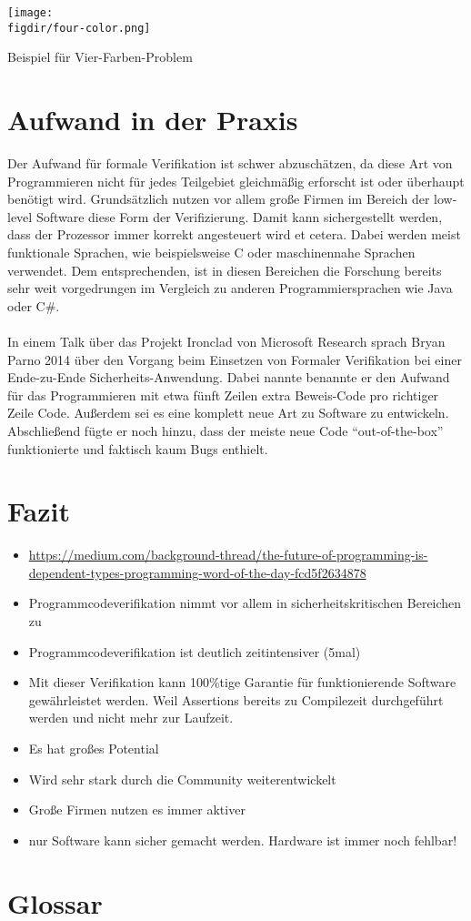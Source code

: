 \begin{minipage}{\textwidth}
	\centering
	\captionsetup{type=figure}
	\texttt{[image: \\figdir/four-color.png]}
	\caption{Beispiel für Vier-Farben-Problem}
	\label{fig:four-color}
\end{minipage}

\section{Aufwand in der Praxis}
Der Aufwand für formale Verifikation ist schwer abzuschätzen, da diese Art von Programmieren nicht für jedes Teilgebiet gleichmäßig erforscht ist oder überhaupt benötigt wird. Grundsätzlich nutzen vor allem große Firmen im Bereich der low-level Software diese Form der Verifizierung. Damit kann sichergestellt werden, dass der Prozessor immer korrekt angesteuert wird et cetera. Dabei werden meist funktionale Sprachen, wie beispielsweise C oder maschinennahe Sprachen verwendet. Dem entsprechenden, ist in diesen Bereichen die Forschung bereits sehr weit vorgedrungen im
Vergleich zu anderen Programmiersprachen wie Java oder C\#.\\
\\
In einem Talk über das Projekt Ironclad von Microsoft Research sprach Bryan Parno 2014 über den Vorgang beim Einsetzen von Formaler Verifikation bei einer Ende-zu-Ende Sicherheits-Anwendung. Dabei nannte benannte er den Aufwand für das Programmieren mit etwa fünft Zeilen extra Beweis-Code pro richtiger Zeile Code. Außerdem sei es eine komplett neue Art zu Software zu entwickeln. Abschließend fügte er noch hinzu, dass der meiste neue Code "`out-of-the-box"' funktionierte und faktisch kaum Bugs enthielt.\cite{IRONCLAD01:FV}

\section{Fazit}
\begin{itemize}
	\item \url{https://medium.com/background-thread/the-future-of-programming-is-dependent-types-programming-word-of-the-day-fcd5f2634878}
	\item Programmcodeverifikation nimmt vor allem in sicherheitskritischen Bereichen zu
	\item Programmcodeverifikation ist deutlich zeitintensiver (5mal)
	\item Mit dieser Verifikation kann 100\%tige Garantie für funktionierende Software gewährleistet werden. Weil Assertions bereits zu Compilezeit durchgeführt werden und nicht mehr zur Laufzeit.
	\item Es hat großes Potential
	\item Wird sehr stark durch die Community weiterentwickelt
	\item Große Firmen nutzen es immer aktiver
	\item nur Software kann sicher gemacht werden. Hardware ist immer noch fehlbar!
\end{itemize}

\section{Glossar}


